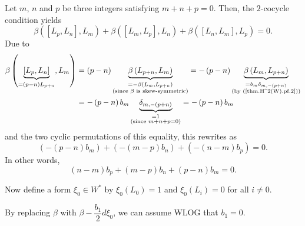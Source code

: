 \documentclass
[numbers=enddot,12pt,final,onecolumn,german,notitlepage]{scrartcl}%
\theoremstyle{definition}
\begin{document}
Let $m$, $n$ and $p$ be three integers satisfying $m+n+p=0$. Then, the
$2$-cocycle condition yields%
\[
\beta\left(  \left[  L_{p},L_{n}\right]  ,L_{m}\right)  +\beta\left(  \left[
L_{m},L_{p}\right]  ,L_{n}\right)  +\beta\left(  \left[  L_{n},L_{m}\right]
,L_{p}\right)  =0.
\]
Due to%
\begin{align*}
\beta\left(  \underbrace{\left[  L_{p},L_{n}\right]  }_{=\left(  p-n\right)
L_{p+n}},L_{m}\right)   &  =\left(  p-n\right)  \underbrace{\beta\left(
L_{p+n},L_{m}\right)  }_{\substack{=-\beta\left(  L_{m},L_{p+n}\right)
\\\text{(since }\beta\text{ is skew-symmetric)}}}=-\left(  p-n\right)
\underbrace{\beta\left(  L_{m},L_{p+n}\right)  }_{\substack{=b_{m}%
\delta_{m,-\left(  p+n\right)  }\\\text{(by (\ref{thm.H^2(W).pf.2}))}}}\\
&  =-\left(  p-n\right)  b_{m}\underbrace{\delta_{m,-\left(  p+n\right)  }%
}_{\substack{=1\\\text{(since }m+n+p=0\text{)}}}=-\left(  p-n\right)  b_{m}%
\end{align*}
and the two cyclic permutations of this equality, this rewrites as%
\[
\left(  -\left(  p-n\right)  b_{m}\right)  +\left(  -\left(  m-p\right)
b_{n}\right)  +\left(  -\left(  n-m\right)  b_{p}\right)  =0.
\]
In other words,%
\begin{equation}
\left(  n-m\right)  b_{p}+\left(  m-p\right)  b_{n}+\left(  p-n\right)
b_{m}=0. \label{thm.H^2(W).pf.3}%
\end{equation}


Now define a form $\xi_{0}\in W^{\ast}$ by $\xi_{0}\left(  L_{0}\right)  =1$
and $\xi_{0}\left(  L_{i}\right)  =0$ for all $i\neq0$.

By replacing $\beta$ with $\beta-\dfrac{b_{1}}{2}d\xi_{0}$, we can assume WLOG
that $b_{1}=0$.
\end{document}
